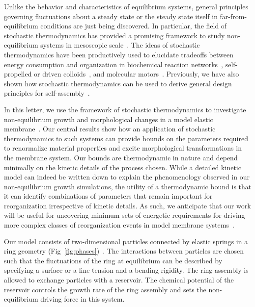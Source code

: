 \documentclass[amsmath,preprintnumbers,10pt,nofootinbib,prl,twocolumn]{revtex4-1}
\begin{document}
Unlike the behavior and characteristics of equilibrium systems, general principles governing fluctuations about a steady state or the steady state itself in far-from-equilibrium conditions are just being discovered. In particular, the field of stochastic thermodynamics has provided a promising framework to study non-equilibrium systems in mesoscopic scale~\cite{Seifert2012}. The ideas of stochastic thermodynamics have been productively used to elucidate tradeoffs between energy consumption and organization in biochemical reaction networks~\cite{Barato2015,Murugan2016,Vaikunt2017}, self-propelled or driven colloids~\cite{Ganguly2013, delJunco2018,Dasbiswas2017}, and molecular motors~\cite{Gaveau2010, Seifert2011}. Previously, we have also shown how stochastic thermodynamics can be used to derive general design principles for self-assembly~\cite{Nguyen2016}. 


In this letter, we use the framework of stochastic thermodynamics to investigate non-equilibrium growth and morphological changes in a model elastic membrane~\cite{Drasdo2000, Ramaswamy2000,Rao2001,Solon2006,Hannezo2011,Fisher1989,Fisher1989a,Rudnick1991,Rajesh2008,Nelson2009}. Our central results show how an application of stochastic thermodynamics to such systems can provide bounds on the parameters required to renormalize material properties and excite morphological transformations in the membrane system. Our bounds are thermodynamic in nature and depend minimally on the kinetic details of the process chosen. While a detailed kinetic model can indeed be written down to explain the phenomenology observed in our non-equilibrium growth simulations, the utility of a thermodynamic bound is that it can identify combinations of parameters that remain important for reorganization irrespective of kinetic details. As such, we anticipate that our work will be useful for uncovering minimum sets of energetic requirements for driving more complex classes of reorganization events in model membrane systems~\cite{Zwicker2017}. 

Our model consists of two-dimensional particles connected by elastic springs in a ring geometry (Fig~\ref{fig:phases})~\cite{Fisher1989,Fisher1989a,Rudnick1991,Rajesh2008,Nelson2009}. The interactions between particles are chosen such that the fluctuations of the ring at equilibrium can be described by specifying a surface or a line tension and a bending rigidity. The ring assembly is allowed to exchange particles with a reservoir. The chemical potential of the reservoir controls the growth rate of the ring assembly and sets the non-equilibrium driving force in this system.
\end{document}

